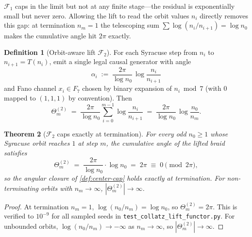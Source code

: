 \documentclass[11pt,a4paper]{article}
\theoremstyle{plain}
\newtheorem{theorem}{Theorem}[section]
\theoremstyle{definition}
\newtheorem{definition}[theorem]{Definition}
\theoremstyle{remark}
\numberwithin{equation}{section}
\begin{document}
\medskip\noindent \(\mathcal{F}_1\) caps in the limit but not at any
finite stage---the residual is exponentially small but never zero.
Allowing the lift to read the orbit values \(n_i\) directly removes
this gap: at termination \(n_m=1\) the telescoping sum
\(\sum\log(n_i/n_{i+1})=\log n_0\) makes the cumulative angle hit
\(2\pi\) exactly.

\begin{definition}[Orbit-aware lift $\mathcal{F}_2$]
\label{def:orbit-aware-lift-F2}
For each Syracuse step from $n_i$ to $n_{i+1}=T(n_i)$, emit a single
legal causal generator with angle
\[
  \alpha_i\;:=\;\frac{2\pi}{\log n_0}\,\log\!\frac{n_i}{n_{i+1}}
\]
and Fano channel $x_i\in F_7$ chosen by binary expansion of
$n_i\bmod 7$ (with $0$ mapped to $(1,1,1)$ by convention).  Then
\[
  \Theta_m^{(2)}\;=\;\frac{2\pi}{\log n_0}\sum_{i=0}^{m-1}\log\!\frac{n_i}{n_{i+1}}
  \;=\;\frac{2\pi}{\log n_0}\,\log\!\frac{n_0}{n_m}.
\]
\end{definition}

\begin{theorem}[$\mathcal{F}_2$ caps exactly at termination]
\label{thm:F2-exact-cap}
For every odd $n_0\ge 1$ whose Syracuse orbit reaches $1$ at step
$m$, the cumulative angle of the lifted braid satisfies
\[
  \Theta_m^{(2)}\;=\;\frac{2\pi}{\log n_0}\cdot\log n_0
  \;=\;2\pi\;\equiv\;0\pmod{2\pi},
\]
so the angular closure of \cref{def:center-cap} holds exactly at
termination.  For non-terminating orbits with $n_m\to\infty$,
$|\Theta_m^{(2)}|\to\infty$.
\end{theorem}

\begin{proof}
At termination $n_m=1$, $\log(n_0/n_m)=\log n_0$, so
$\Theta_m^{(2)}=2\pi$.  This is verified to $10^{-9}$ for all
sampled seeds in \texttt{test\_collatz\_lift\_functor.py}.  For
unbounded orbits, $\log(n_0/n_m)\to-\infty$ as $n_m\to\infty$, so
$|\Theta_m^{(2)}|\to\infty$.
\end{proof}
\end{document}
